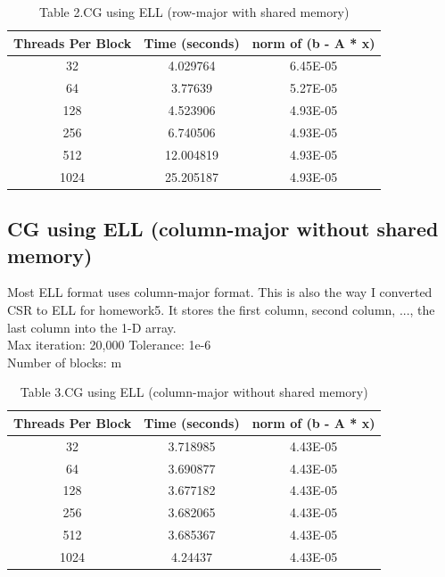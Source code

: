 \documentclass[a4paper,11pt,BCOR10mm,oneside,headsepline]{scrartcl}
\begin{document}
		\begin{table}[!htbp]
			\centering
			\begin{tabular}{|c|c|c|}
				\hline
				\textbf{Threads Per Block} & \textbf{Time (seconds)} & \textbf{norm of (b - A * x)} \\ \hline
				32                         & 4.029764                & 6.45E-05                     \\ \hline
				64                         & 3.77639                 & 5.27E-05                     \\ \hline
				128                        & 4.523906                & 4.93E-05                     \\ \hline
				256                        & 6.740506                & 4.93E-05                     \\ \hline
				512                        & 12.004819               & 4.93E-05                     \\ \hline
				1024                       & 25.205187               & 4.93E-05                     \\ \hline
			\end{tabular}
			\caption*{Table 2.CG using ELL (row-major with shared memory)}
		\end{table}
		
		\newpage
		\subsection{CG using ELL (column-major without shared memory)}
		Most ELL format uses column-major format. This is also the way I converted CSR to ELL for homework5. It stores the first column, second column, ..., the last column into the 1-D array.\\
		Max iteration: 20,000 Tolerance: 1e-6\\
		Number of blocks: m\\
		
		\begin{table}[!htbp]
			\centering
			\begin{tabular}{|c|c|c|}
				\hline
				\textbf{Threads Per Block} & \textbf{Time (seconds)} & \textbf{norm of (b - A * x)} \\ \hline
				32                         & 3.718985                & 4.43E-05                     \\ \hline
				64                         & 3.690877                & 4.43E-05                     \\ \hline
				128                        & 3.677182                & 4.43E-05                     \\ \hline
				256                        & 3.682065                & 4.43E-05                     \\ \hline
				512                        & 3.685367                & 4.43E-05                     \\ \hline
				1024                       & 4.24437                 & 4.43E-05                     \\ \hline
			\end{tabular}
			\caption*{Table 3.CG using ELL (column-major without shared memory)}
		\end{table}
		
\end{document}
